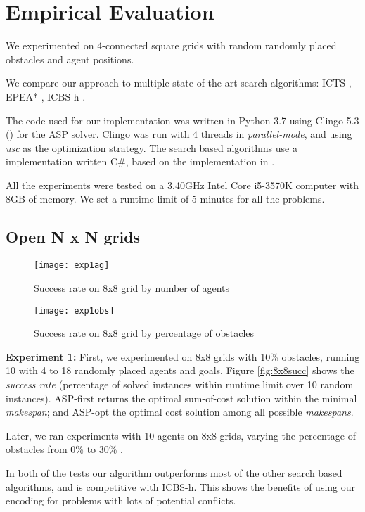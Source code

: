 \section{Empirical Evaluation}
We experimented on 4-connected square grids with random randomly placed obstacles and agent positions.

We compare our approach to multiple state-of-the-art search algorithms: ICTS \cite{Sharon13}, EPEA* \cite{Goldenberg14}, ICBS-h \cite{FelnerLB00KK18}.

The code used for our implementation was written in Python 3.7 using Clingo 5.3 () for the ASP solver. Clingo was run with 4 threads in \textit{parallel-mode}, and using \textit{usc} as the optimization strategy. The search based algorithms use a implementation written C\#, based on the implementation in \cite{FelnerLB00KK18}.

All the experiments were tested on a 3.40GHz Intel Core i5-3570K computer with 8GB of memory. We set a runtime limit of 5 minutes for all the problems.

\subsection{Open N x N grids}



\begin{figure}[]
    \centering
    \texttt{[image: exp1ag]}
    \caption{Success rate on 8x8 grid by number of agents}
    \label{fig:8x8succ}
    \texttt{[image: exp1obs]}
    \caption{Success rate on 8x8 grid by percentage of obstacles}
    \label{fig:8x8obs}
\end{figure}

\textbf{Experiment 1:} First, we experimented on 8x8 grids with 10\% obstacles, running 10 with 4 to 18 randomly placed agents and goals. Figure \ref{fig:8x8succ} shows the \textit{success rate} (percentage of solved instances within runtime limit over 10 random instances). ASP-first returns the optimal sum-of-cost solution within the minimal \emph{makespan}; and ASP-opt the optimal cost solution among all possible \emph{makespans}.

Later, we ran experiments with 10 agents on 8x8 grids, varying the percentage of obstacles from 0\% to 30\% .

In both of the tests our algorithm outperforms most of the other search based algorithms, and is competitive with ICBS-h. This shows the benefits of using our encoding for problems with lots of potential conflicts. 

